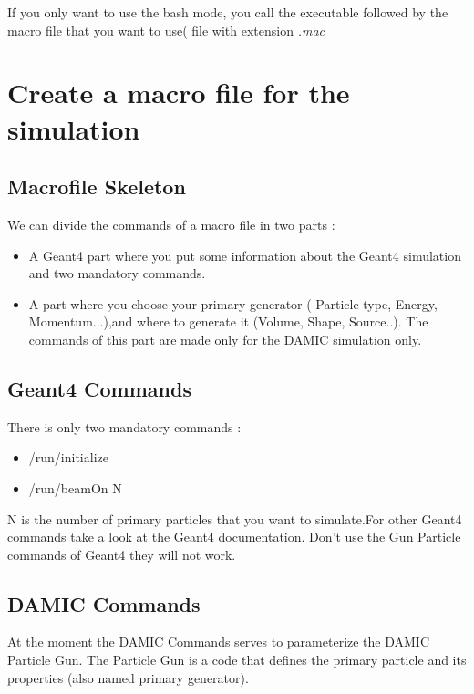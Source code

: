 \documentclass[français,final,twoside,12pt]{article}
\begin{document}
If you only want to use the bash mode, you call the executable followed by the macro file that you want to use( file with extension \textit{.mac}

\section{Create a macro file for the simulation}

\subsection{Macrofile Skeleton}

We can divide the commands of a macro file in two parts :

\begin{itemize}
\item A Geant4 part where you put some information about the Geant4 simulation and two mandatory commands.
\item A part where you choose your primary generator ( Particle type, Energy, Momentum...),and  where to generate it  (Volume, Shape, Source..). The commands of this part are made only for the DAMIC simulation only.
\end{itemize}
 
\subsection{Geant4 Commands}

There is only two mandatory commands :
\begin{itemize}
\item /run/initialize
\item /run/beamOn N
\end{itemize}




N is the number of primary particles that you want to simulate.For other Geant4 commands take a look at the Geant4 documentation. Don't use the Gun Particle commands of Geant4 they will not work. 

\subsection{DAMIC Commands}

At the moment the DAMIC Commands serves to parameterize the DAMIC Particle Gun. The Particle Gun is a code that defines the primary particle and its properties (also named primary generator).\\ 
\end{document}

